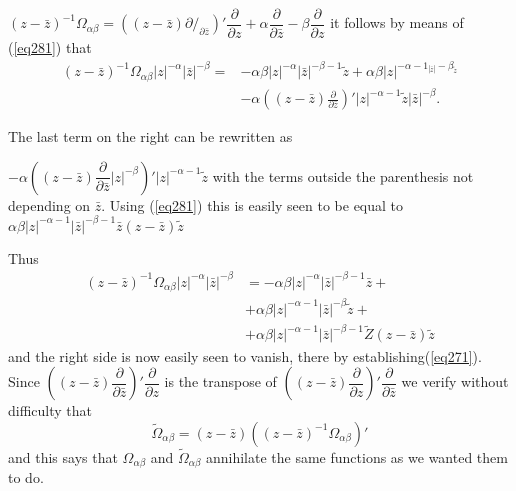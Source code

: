 \noindent
$(z-\bar{z})^{-1} \Omega_{\alpha
  \beta}=((z-\bar{z})\partial/_{\partial \bar{z}})'
\dfrac{\partial}{\partial z}+\alpha \dfrac{\partial}{\partial
  \bar{z}}- \beta \dfrac{\partial}{\partial z}$ 
it follows by means of (\ref{eq281}) that
\begin{align*}
(z-\bar{z})^{-1} \Omega_{\alpha \beta}|z|^{- \alpha}|\bar{z}|^{-
    \beta}= & - \alpha \beta |z|^{-\alpha }|\bar{z}|^{- \beta
    -1}\tilde{z}+\alpha \beta |z|^{- \alpha
    -1_{|\bar{z}|}-\beta_{\tilde{z}}}\\ 
& - \alpha((z-\bar{z})\frac{\partial}{\partial \bar{z}})'|z|^{-
    \alpha-1}\tilde{z}|\bar{z}|^{-\beta}. 
\end{align*}

The last term on the right can be rewritten as

$-\alpha((z-\bar{z})\dfrac{\partial}{\partial \bar{z}}|z|^{-\beta})'
|z|^{-\alpha-1}\tilde{z} $ with the terms outside the parenthesis not
depending on $\bar{z}$. Using (\ref{eq281}) this is easily seen to be equal
to $\alpha \beta |z|^{-\alpha-1}|\bar{z}|^{-\beta-1}\bar{z}(z-\bar{z})
\tilde{z}$ 

Thus
\begin{align*}
(z-\bar{z})^{-1}\Omega_{\alpha \beta}|z|^{- \alpha}|\bar{z}|^{-\beta}
  & = -\alpha \beta |z|^{- \alpha}|\bar{z}|^{-\beta-1}\bar{z}+\\ 
& + \alpha \beta |z|^{-\alpha-1}|\bar{z}|^{-\beta}\tilde{z}+\\
& + \alpha \beta
  |z|^{-\alpha-1}|\bar{z}|^{-\beta-1}\tilde{Z}(z-\bar{z})\tilde{z} 
\end{align*}
and the right side is now easily seen to vanish, there by
establishing\pageoriginale (\ref{eq271}). Since
$((z-\bar{z})\dfrac{\partial}{\partial
  \bar{z}})'\dfrac{\partial}{\partial z}$ is the transpose of
$((z-\bar{z})\dfrac{\partial}{\partial z})'\dfrac{\partial}{\partial
  \bar{z}}$ we verify without difficulty that  
$$
\tilde{\Omega}_{\alpha
  \beta}=(z-\bar{z})((z-\bar{z})^{-1}\Omega_{\alpha \beta})' 
$$
and this says that $\Omega_{\alpha \beta}$ and $\tilde{\Omega}_{\alpha
  \beta}$ annihilate the same functions as we wanted them to do. 


